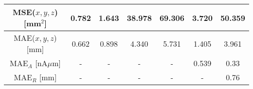 \documentclass[a4paper, UKenglish, 11pt]{uiomaster}
\begin{document}
\begin{table}[]
\begin{tabular}{c|cccccc|}
\multicolumn{1}{|c|}{\cellcolor[HTML]{EFEFEF}MSE($x, y, z$) {[}mm$^2${]}}                                           & \multicolumn{1}{c|}{0.782}                                                                                & \multicolumn{1}{c|}{1.643}                                                                                 & \multicolumn{1}{c|}{38.978}                                                                              & \multicolumn{1}{c|}{69.306}                                                                             & \multicolumn{1}{c|}{3.720}                                                                                            & 50.359                                                                                       \\ \hline
\multicolumn{1}{|c|}{\cellcolor[HTML]{EFEFEF}MAE($x, y, z$) {[}mm{]}}                                               & \multicolumn{1}{c|}{0.662}                                                                                & \multicolumn{1}{c|}{0.898}                                                                                 & \multicolumn{1}{c|}{4.340}                                                                               & \multicolumn{1}{c|}{5.731}                                                                              & \multicolumn{1}{c|}{1.405}                                                                                            & 3.961                                                                                        \\ \hline
\multicolumn{1}{|c|}{\cellcolor[HTML]{EFEFEF}MAE$_A$ {[}nA$\mu$m{]}}                                                 & \multicolumn{1}{c|}{-}                                                                                    & \multicolumn{1}{c|}{-}                                                                                     & \multicolumn{1}{c|}{-}                                                                                   & \multicolumn{1}{c|}{-}                                                                                  & \multicolumn{1}{c|}{0.539}                                                                                            & 0.33                                                                                         \\ \hline
\multicolumn{1}{|c|}{\cellcolor[HTML]{EFEFEF}MAE$_R$ {[}mm{]}}                                                      & \multicolumn{1}{c|}{-}                                                                                    & \multicolumn{1}{c|}{-}                                                                                     & \multicolumn{1}{c|}{-}                                                                                   & \multicolumn{1}{c|}{-}                                                                                  & \multicolumn{1}{c|}{-}                                                                                                & 0.76                                                                                         \\ \hline

\end{tabular}
\end{table}
\end{document}
